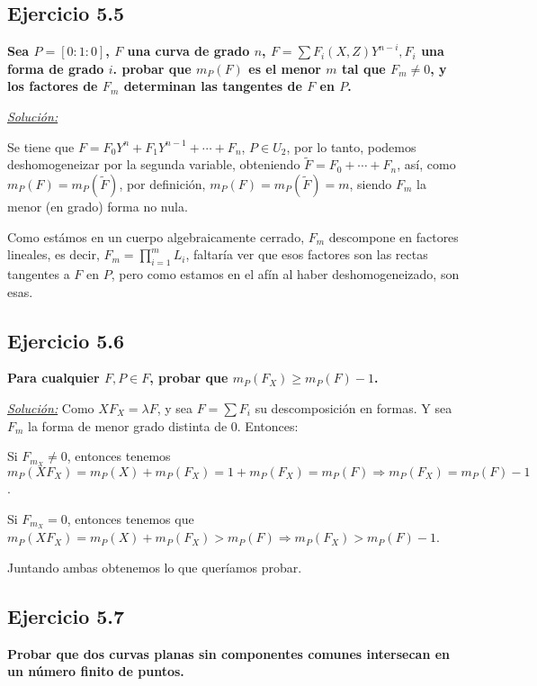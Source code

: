 \subsection{Ejercicio 5.5}

\textbf{Sea $P=[0:1:0]$, $F$ una curva de grado $n$, $F=\sum F_i(X,Z)Y^{n-i},F_i$ una forma de grado $i$. probar que $m_P(F)$ es el menor $m$ tal que $F_m\neq 0$, y los factores de $F_m$ determinan las tangentes de $F$ en $P$.}

\underline{\textit{Solución:}}

Se tiene que $F=F_0Y^n+F_1Y^{n-1}+\cdots +F_n$, $P\in U_2$, por lo tanto, podemos deshomogeneizar por la segunda variable, obteniendo $\tilde{F}=F_0+\cdots + F_n$, así, como $m_P(F)=m_P(\tilde{F})$, por definición, $m_P(F)=m_P(\tilde{F})=m$, siendo $F_m$ la menor (en grado) forma no nula.

Como estámos en un cuerpo algebraicamente cerrado, $F_m$ descompone en factores lineales, es decir, $F_m=\prod_{i=1}^mL_i$, faltaría ver que esos factores son las rectas tangentes a $F$ en $P$, pero como estamos en el afín al haber deshomogeneizado, son esas. 

\subsection{Ejercicio 5.6}

\textbf{Para cualquier $F,P\in F$, probar que $m_P(F_X)\ge m_P(F)-1$.}

\underline{\textit{Solución:}}
Como $XF_X=\lambda F$, y sea $F=\sum F_i$ su descomposición en formas. Y sea $F_m$ la forma de menor grado distinta de 0. Entonces:
\begin{itemize*}
\item Si $F_{m_X}\neq 0$, entonces tenemos $m_P(XF_X)=m_P(X)+m_P(F_X)=1+m_P(F_X)= m_P(F) \Rightarrow m_P(F_X)= m_P(F)-1$.

\item Si $F_{m_X}=0$, entonces tenemos que $m_P(XF_X)=m_P(X)+m_P(F_X)>m_P(F)\Rightarrow m_P(F_X)>m_P(F)-1$.
\end{itemize*}
Juntando ambas obtenemos lo que queríamos probar.

\subsection{Ejercicio 5.7}

\textbf{Probar que dos curvas planas sin componentes comunes intersecan en un número finito de puntos.}

